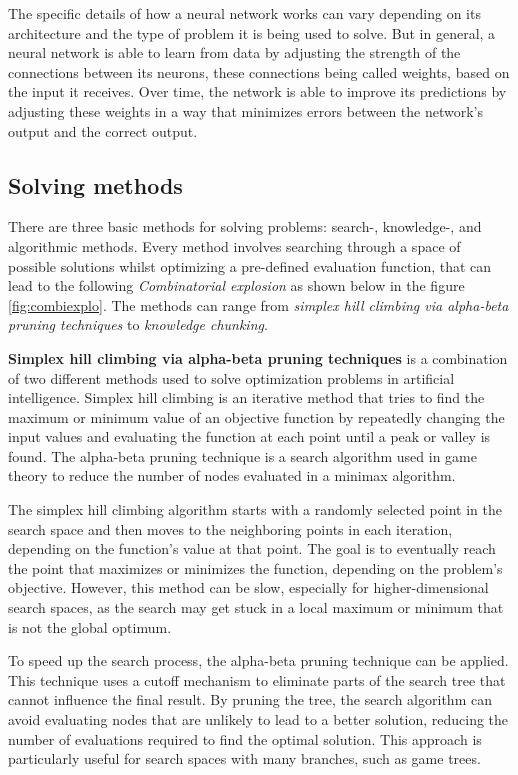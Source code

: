 The specific details of how a neural network works can vary depending on its architecture
and the type of problem it is being used to solve. But in general, a neural network is able 
to learn from data by adjusting the strength of the connections between its neurons, these 
connections being called weights, based on the input it receives. Over time, the network is 
able to improve its predictions by adjusting these weights in a way that minimizes errors 
between the network's output and the correct output.

\subsection{Solving methods}
There are three basic methods for solving problems: 
search-, knowledge-, and algorithmic methods. 
Every method involves searching through a space of possible
solutions whilst optimizing a pre-defined evaluation function, 
that can lead to the following \emph{Combinatorial explosion} as shown below in the figure \ref{fig:combiexplo}. 
The methods can range from \emph{simplex hill climbing via alpha-beta pruning techniques} to \emph{knowledge chunking}. 

\textbf{Simplex hill climbing via alpha-beta pruning techniques} is a combination of two different methods used to solve optimization problems 
in artificial intelligence. Simplex hill climbing is an iterative method that tries to find the maximum or minimum value of an objective function 
by repeatedly changing the input values and evaluating the function at each point until a peak or valley is found. The alpha-beta pruning 
technique is a search algorithm used in game theory to reduce the number of nodes evaluated in a minimax algorithm.

The simplex hill climbing algorithm starts with a randomly selected point in the search space and then moves to the neighboring points 
in each iteration, depending on the function's value at that point. The goal is to eventually reach the point that maximizes or minimizes 
the function, depending on the problem's objective. However, this method can be slow, especially for higher-dimensional search spaces, 
as the search may get stuck in a local maximum or minimum that is not the global optimum.

To speed up the search process, the alpha-beta pruning technique can be applied. This technique uses a cutoff mechanism to eliminate 
parts of the search tree that cannot influence the final result. By pruning the tree, the search algorithm can avoid evaluating nodes 
that are unlikely to lead to a better solution, reducing the number of evaluations required to find the optimal solution. This approach 
is particularly useful for search spaces with many branches, such as game trees.

